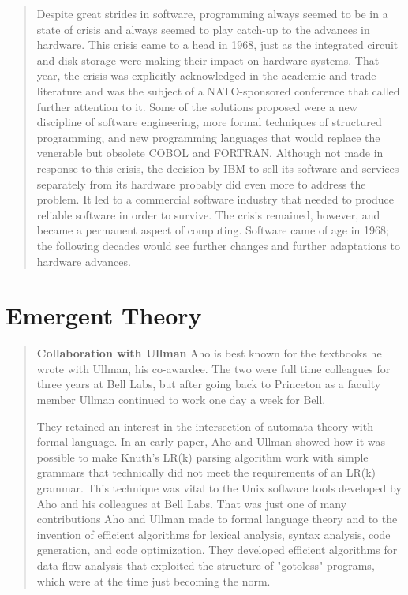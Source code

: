 \begin{quotation}
Despite great strides in software, programming always seemed to be in a state 
of crisis and always seemed to play catch-up to the advances in hardware. This 
crisis came to a head in 1968, just as the integrated circuit and disk storage 
were making their impact on hardware systems. That year, the crisis was 
explicitly acknowledged in the academic and trade literature and was the 
subject of a NATO-sponsored conference that called further attention to it. 
Some of the solutions proposed were a new discipline of software engineering, 
more formal techniques of structured programming, and new programming languages 
that would replace the venerable but obsolete COBOL and FORTRAN. Although not 
made in response to this crisis, the decision by IBM to sell its software and 
services separately from its hardware probably did even more to address the 
problem. It led to a commercial software industry that needed to produce 
reliable software in order to survive. The crisis remained, however, and became 
a permanent aspect of computing. Software came of age in 1968; the following 
decades would see further changes and further adaptations to hardware advances.
\end{quotation}


\section{Emergent Theory}


\begin{quotation}
\textbf{Collaboration with Ullman}
Aho is best known for the textbooks he wrote with Ullman, his co-awardee. The 
two were full time colleagues for three years at Bell Labs, but after going 
back to Princeton as a faculty member Ullman continued to work one day a week 
for Bell.

They retained an interest in the intersection of automata theory with formal 
language. In an early paper, Aho and Ullman showed how it was possible to make 
Knuth's LR(k) parsing algorithm work with simple grammars that technically did 
not meet the requirements of an LR(k) grammar. This technique was vital to the 
Unix software tools developed by Aho and his colleagues at Bell Labs. That was 
just one of many contributions Aho and Ullman made to formal language theory 
and to the invention of efficient algorithms for lexical analysis, syntax 
analysis, code generation, and code optimization. They developed efficient 
algorithms for data-flow analysis that exploited the structure of "gotoless" 
programs, which were at the time just becoming the norm.
\cite{aho_turing_award_2020}
\end{quotation}

